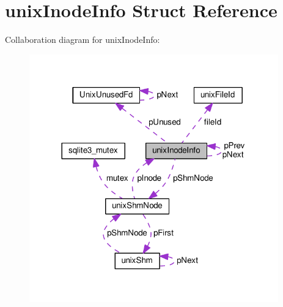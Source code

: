 \hypertarget{structunixInodeInfo}{}\section{unix\+Inode\+Info Struct Reference}
\label{structunixInodeInfo}


Collaboration diagram for unix\+Inode\+Info\+:\nopagebreak
\begin{figure}[H]
\begin{center}
\leavevmode
\includegraphics[width=305pt]{structunixInodeInfo__coll__graph}
\end{center}
\end{figure}
